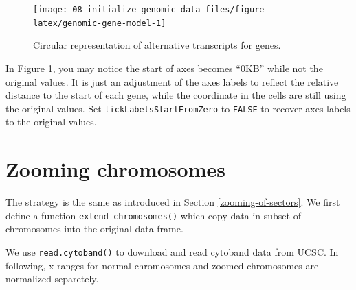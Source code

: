 \documentclass[]{book}
\newenvironment{Shaded}{\begin{snugshade}}{\end{snugshade}}
\newcommand{\KeywordTok}[1]{\textcolor[rgb]{0.13,0.29,0.53}{\textbf{#1}}}
\newcommand{\DataTypeTok}[1]{\textcolor[rgb]{0.13,0.29,0.53}{#1}}
\newcommand{\DecValTok}[1]{\textcolor[rgb]{0.00,0.00,0.81}{#1}}
\newcommand{\StringTok}[1]{\textcolor[rgb]{0.31,0.60,0.02}{#1}}
\newcommand{\OtherTok}[1]{\textcolor[rgb]{0.56,0.35,0.01}{#1}}
\newcommand{\ControlFlowTok}[1]{\textcolor[rgb]{0.13,0.29,0.53}{\textbf{#1}}}
\newcommand{\OperatorTok}[1]{\textcolor[rgb]{0.81,0.36,0.00}{\textbf{#1}}}
\newcommand{\NormalTok}[1]{#1}
\begin{document}
\begin{figure}

{\centering \texttt{[image: 08-initialize-genomic-data\_files/figure-latex/genomic-gene-model-1]} 

}

\caption{Circular representation of alternative transcripts for genes.}\label{fig:genomic-gene-model}
\end{figure}

In Figure \ref{fig:genomic-gene-model}, you may notice the start of axes
becomes ``0KB'' while not the original values. It is just an adjustment
of the axes labels to reflect the relative distance to the start of each
gene, while the coordinate in the cells are still using the original
values. Set \texttt{tickLabelsStartFromZero} to \texttt{FALSE} to
recover axes labels to the original values.

\section{Zooming chromosomes}\label{zooming-chromosomes}

The strategy is the same as introduced in Section
\ref{zooming-of-sectors}. We first define a function
\texttt{extend\_chromosomes()} which copy data in subset of chromosomes
into the original data frame.

\begin{Shaded}
\end{Shaded}

We use \texttt{read.cytoband()} to download and read cytoband data from
UCSC. In following, x ranges for normal chromosomes and zoomed
chromosomes are normalized separetely.
\end{document}
